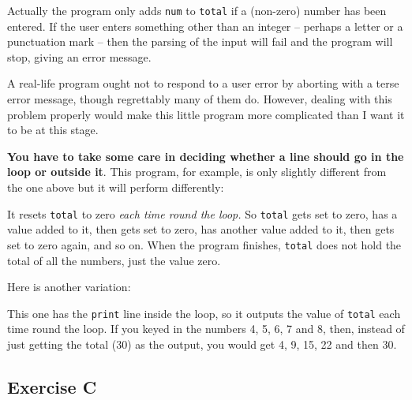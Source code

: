 Actually the program only adds  \texttt{num} to \texttt{total} if a (non-zero) 
number has been entered. 
If the user enters something other than an integer 
-- perhaps a letter or a punctuation mark -- 
then the parsing of the input will fail 
and the program will stop, giving an error message.

A real-life program ought not to respond to a user error by aborting
with a terse error message, though regrettably many of them do.
However, dealing with this problem properly would make this little program
more complicated than I want it to be at this stage.

\textbf{You have to take some care in deciding whether a line should go in the
loop or outside it}.  This program, for example, is only slightly different
from the one above but it will perform differently:


It resets \texttt{total} to zero \emph{each time round the loop.}  So
\texttt{total} gets set to zero,
has a value added to it, then gets set to zero, has another value added to
it, then gets set to zero again, and so on.  When the program finishes,
\texttt{total} does not hold the total of all the numbers, just the value
zero.

\pagebreak

Here is another variation:


This one has the \texttt{print} line inside the loop, so it outputs the value
of \texttt{total} each time round the loop.  If you keyed in the numbers
4, 5, 6, 7 and 8, then, instead of just getting the total (30) as the output,
you would get 4, 9, 15, 22 and then 30.

\subsection*{Exercise C}


